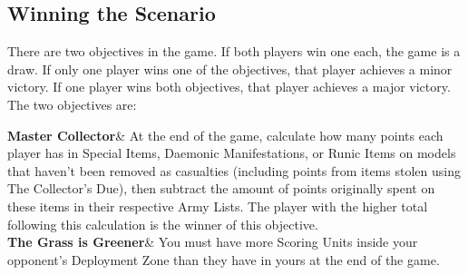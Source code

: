\subsection*{Winning the Scenario}

There are two objectives in the game. If both players win one each, the game is a draw. If only one player wins one of the objectives, that player achieves a minor victory. If one player wins both objectives, that player achieves a major victory. The two objectives are:

\begin{tableterrain}%
\textbf{Master Collector}&
At the end of the game, calculate how many points each player has in Special Items, Daemonic Manifestations, or Runic Items on models that haven't been removed as casualties (including points from items stolen using The Collector's Due), then subtract the amount of points originally spent on these items in their respective Army Lists. The player with the higher total following this calculation is the winner of this objective.\\
\textbf{The Grass is Greener}&
You must have more Scoring Units inside your opponent's Deployment Zone than they have in yours at the end of the game.\\
\end{tableterrain}
